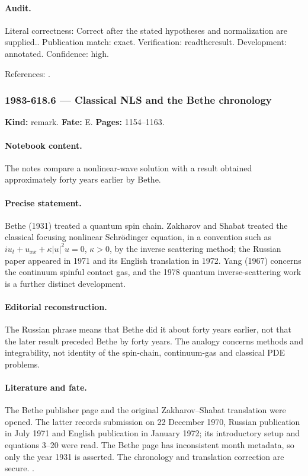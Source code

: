 \paragraph{Audit.} Literal correctness: Correct after the stated hypotheses and normalization are supplied.. Publication match: exact. Verification: readtheresult. Development: annotated. Confidence: high.

\noindent References: \citep{yang1967manybody,yang1968smatrix}.\par

\subsubsection{1983-618.6 --- Classical NLS and the Bethe chronology}

\label{item:1983-618.6}

\noindent\textbf{Kind:} remark. \textbf{Fate:} E. \textbf{Pages:} 1154--1163.\par

\paragraph{Notebook content.} The notes compare a nonlinear-wave solution with a result obtained approximately forty years earlier by Bethe.

\paragraph{Precise statement.} Bethe (1931) treated a quantum spin chain. Zakharov and Shabat treated the classical focusing nonlinear Schrödinger equation, in a convention such as $iu_t+u_{xx}+\kappa|u|^2u=0$, $\kappa>0$, by the inverse scattering method; the Russian paper appeared in 1971 and its English translation in 1972. Yang (1967) concerns the continuum spinful contact gas, and the 1978 quantum inverse-scattering work is a further distinct development.

\paragraph{Editorial reconstruction.} The Russian phrase  means that Bethe did it about forty years earlier, not that the later result preceded Bethe by forty years. The analogy concerns methods and integrability, not identity of the spin-chain, continuum-gas and classical PDE problems.

\paragraph{Literature and fate.} The Bethe publisher page and the original Zakharov--Shabat translation were opened. The latter records submission on 22 December 1970, Russian publication in July 1971 and English publication in January 1972; its introductory setup and equations 3--20 were read. The Bethe page has inconsistent month metadata, so only the year 1931 is asserted. The chronology and translation correction are secure. \citep{bethe1931metalle,zakharovshabat1972nls,yang1967manybody,sklyaninfaddeev1978quantum}.

